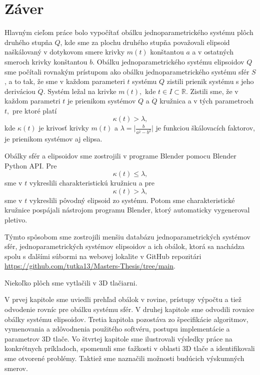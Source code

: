 \chapter*{Záver}
Hlavným cieľom práce bolo vypočítať obálku jednoparametrického systému plôch druhého stupňa $Q$, kde sme za plochu druhého stupňa považovali elipsoid naškálovaný v dotykovom smere krivky $m(t)$ konštantou $a$ a v ostatných smeroch krivky konštantou $b$. Obálku jednoparametrického systému elipsoidov $Q$ sme počítali rovnakým prístupom ako obálku jednoparametrického systému sfér $S$, a to tak, že sme v každom parameteri $t$ systému $Q$ zistili prienik systému s jeho deriváciou $\dot{Q}$. Systém ležal na krivke $m(t),$ kde $t \in I \subset \mathbb{R}.$
Zistili sme, že v každom parametri $t$ je prienikom systémov $Q$ a $\dot{Q}$ kružnica a v tých parametroch $t,$ pre ktoré platí
$$
\kappa(t) > \lambda,
$$  
kde $\kappa(t)$ je krivosť krivky $m(t)$ a $\lambda = \big| \frac{b}{a^2 - b^2} \big| $ je funkciou škálovacích faktorov, je prienikom systémov aj elipsa.

Obálky sfér a elipsoidov sme zostrojili v programe Blender pomocu Blender Python API. Pre 
$$
\kappa(t) \leq \lambda,
$$  
sme v $t$ vykreslili charakteristickú kružnicu a pre
$$
\kappa(t) > \lambda,
$$  
sme v $t$ vykreslili pôvodný elipsoid zo systému.
Potom sme charakteristické kružnice pospájali nástrojom programu Blender, ktorý automaticky vygeneroval pletivo. 

Týmto spôsobom sme zostrojili menšiu databázu jednoparametrických systémov sfér, jednoparametrických systémov elipsoidov a ich obálok, ktorá sa nachádza spolu s ďalšími súbormi na webovej lokalite v GitHub repozitári \url{https://github.com/tutka13/Masters-Thesis/tree/main}. 

Niekoľko plôch sme vytlačili v 3D tlačiarni.

V prvej kapitole sme uviedli prehľad obálok v rovine, prístupy výpočtu a tiež odvodenie rovníc pre obálku systému sfér. V druhej kapitole sme odvodili rovnice obálky systému elipsoidov. Tretia kapitola pozostáva zo špecifikácie algoritmov, vymenovania a zdôvodnenia použitého softvéru, postupu implementácie a parametrov 3D tlače. Vo štvrtej kapitole sme ilustrovali výsledky práce na konkrétnych príkladoch, spomenuli sme ťažkosti v oblasti 3D tlače a identifikovali sme otvorené problémy. Taktiež sme naznačili možnosti budúcich výskumných smerov.